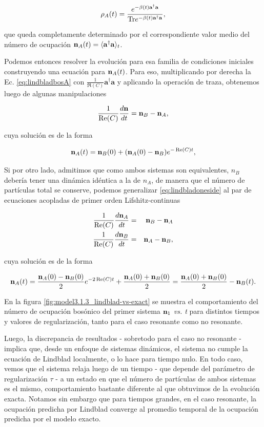 \documentclass{report} %
\numberwithin{equation}{section}
\begin{document}
$$
\rho_A(t)=\frac{e^{-\beta(t){\mathbf a}^\dagger {\mathbf a}}}{{\Tr}e^{-\beta(t){\mathbf a}^\dagger {\mathbf a}}},
$$

que queda completamente determinado por el correspondiente valor medio del número de ocupación ${\bf n}_A(t)=\langle{\mathbf a}^\dagger{\mathbf a}\rangle_t$.

Podemos entonces resolver la evolución para esa familia de condiciones iniciales construyendo una ecuación para ${\bf n}_A(t)$. Para eso, multiplicando por derecha la Ec. \ref{eq:lindbladbosA} con $\frac{1}{\Re(C)}{\mathbf a}^\dagger{\mathbf a}$ y aplicando la operación de traza, obtenemos luego de algunas manipulaciones 

\begin{equation}
  \label{eq:lindbladoneside}
\frac{1}{\Re(C)}\frac{d {\bf n}}{dt}= {\bf n}_B-{\bf n}_A,
\end{equation}

cuya solución es de la forma

$$
{\bf n}_{A}(t)={\bf n}_{B}(0)+({\bf n}_{A}(0)-{\bf n}_{B})e^{-\Re(C)t },
$$

Si por otro lado, admitimos que como ambos sistemas son equivalentes, $n_B$ debería tener una dinámica idéntica a la de $n_A$, de manera que el número de partículas total se conserve, podemos generalizar \ref{eq:lindbladoneside} al par de ecuaciones acopladas de primer orden Lifshitz-continuas


\begin{eqnarray}
  \label{eq:lindbladtwoside}
  \frac{1}{\Re(C)}\frac{d {\bf n}_A}{dt}&=& {\bf n}_B-{\bf n}_A\\
  \frac{1}{\Re(C)}\frac{d {\bf n}_B}{dt}&=& {\bf n}_A-{\bf n}_B,
\end{eqnarray}

cuya solución es de la forma

$$
{\bf n}_A(t)=\frac{{\bf n}_{A}(0)-{\bf n}_B(0)}{2}e^{-2 \Re(C) t} + \frac{{\bf n}_{A}(0)+{\bf n}_B(0)}{2}=\frac{{\bf n}_{A}(0)+{\bf n}_B(0)}{2}-{\bf n}_{B}(t).
$$

En la figura \ref{fig:model3.1.3_lindblad-vs-exact} se muestra el comportamiento del número de ocupación bosónico del primer sistema ${\bf n}_1 $ \textit{vs. t} para distintos tiempos y valores de regularización, tanto para el caso resonante como no resonante. 

Luego, la discrepancia de resultados - sobretodo para el caso no resonante - implica que, desde un enfoque de sistemas dinámicos, el sistema no cumple la ecuación de Lindblad localmente, o lo hace para tiempo nulo. En todo caso, vemos que el sistema relaja luego de un tiempo - que depende del parámetro de regularización $\tau$ - a un estado en que el número de partículas de ambos sistemas es el mismo, comportamiento bastante diferente al que obtuvimos de la evolución exacta. Notamos sin embargo que para tiempos grandes, en el caso resonante, la ocupación predicha por Lindblad converge al promedio temporal de la ocupación predicha por el modelo exacto. 
\end{document}
